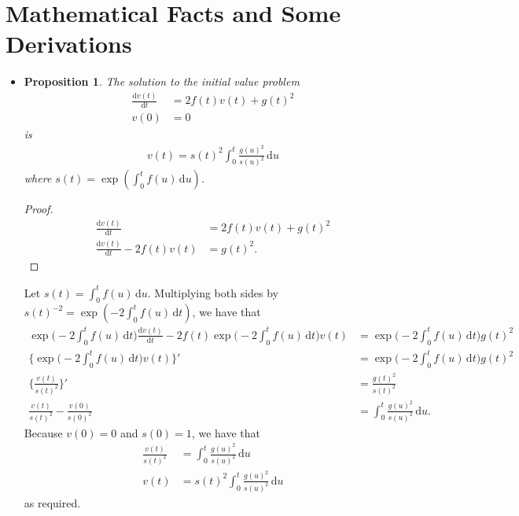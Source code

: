 \documentclass[10pt]{article}
\newtheorem{proposition}[lemma]{Proposition}
\newcommand{\dee}{\mathrm{d}}
\begin{document}
\appendix

\section{Mathematical Facts and Some Derivations}

\begin{itemize}
  \item \begin{proposition} \label{thm:linear-sde-variance}
    The solution to the initial value problem 
    \begin{align*}
      \frac{\dee v(t)}{\dee t} &= 2f(t)v(t) + g(t)^2 \\
      v(0) &= 0      
    \end{align*}
    is
    \begin{align*}
      v(t) = s(t)^2 \int_0^t \frac{g(u)^2}{s(u)^2}\, \dee u
    \end{align*}
    where $s(t) = \exp(\int_0^t f(u)\, \dee u)$.
  \end{proposition}
  \begin{proof}
    \begin{align*}
    \frac{\dee v(t)}{\dee t} &= 2f(t)v(t) + g(t)^2 \\
    \frac{\dee v(t)}{\dee t} - 2f(t)v(t) &= g(t)^2.
    \end{align*}
  \end{proof}
  Let $s(t) = \int_0^t f(u)\, \dee u$.
  Multiplying both sides by $s(t)^{-2} = \exp(-2\int_0^t f(u)\, \dee t)$, we have that
  \begin{align*}
    \exp\bigg( -2 \int_0^t f(u)\, \dee t \bigg) \frac{\dee v(t)}{\dee t}
    - 2f(t) \exp\bigg( -2 \int_0^t f(u)\, \dee t \bigg) v(t)
    &= \exp\bigg( -2 \int_0^t f(u)\, \dee t \bigg) g(t)^2 \\
    \bigg\{ \exp\bigg( -2 \int_0^t f(u)\, \dee t \bigg) v(t) \bigg\}'
    &= \exp\bigg( -2 \int_0^t f(u)\, \dee t \bigg) g(t)^2 \\
    \bigg\{ \frac{v(t)}{s(t)^2} \bigg\}'
    &= \frac{g(t)^2}{s(t)^2} \\
    \frac{v(t)}{s(t)^2} - \frac{v(0)}{s(0)^2} &= \int_0^t \frac{g(u)^2}{s(u)^2}\, \dee u.
  \end{align*}
  Because $v(0) = 0$ and $s(0) = 1$, we have that
  \begin{align*}
    \frac{v(t)}{s(t)^2} &= \int_0^t \frac{g(u)^2}{s(u)^2}\, \dee u \\
    v(t) &= s(t)^2 \int_0^t \frac{g(u)^2}{s(u)^2}\, \dee u
  \end{align*}
  as required.


\end{itemize}
\end{document}
